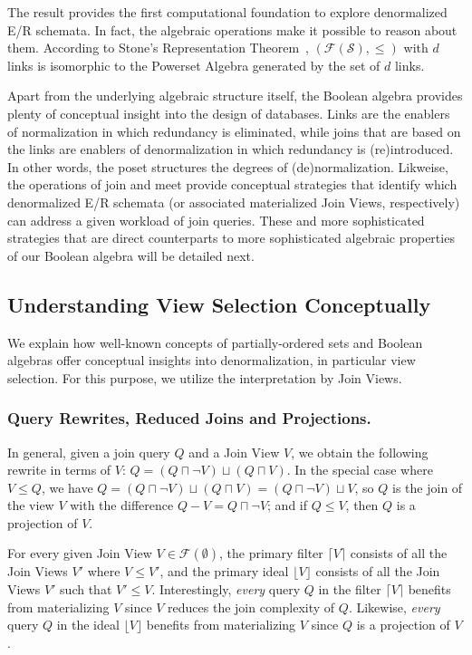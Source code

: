 \documentclass[sigconf]{acmart}
\begin{document}
The result provides the first computational foundation to explore denormalized E/R schemata. In fact, the algebraic operations make it possible to reason about them. According to Stone's Representation Theorem~\cite{stone1936}, $(\mathcal{F}(\mathcal{S}),\le)$ with $d$ links is isomorphic to the Powerset Algebra generated by the set of $d$ links.

Apart from the underlying algebraic structure itself, the Boolean algebra provides plenty of conceptual insight into the design of databases. Links are the enablers of normalization in which redundancy is eliminated, while joins that are based on the links are enablers of denormalization in which redundancy is (re)introduced. In other words, the poset structures the degrees of (de)normalization. Likweise, the operations of join and meet provide conceptual strategies that identify which denormalized E/R schemata (or associated materialized Join Views, respectively) can address a given workload of join queries. These and more sophisticated strategies that are direct counterparts to more sophisticated algebraic properties of our Boolean algebra will be detailed next.

\subsection{Understanding View Selection Conceptually}\label{sec:conceptual-view-selection}

We explain how well-known concepts of partially-ordered sets and Boolean algebras offer conceptual insights into denormalization, in particular view selection. For this purpose, we utilize the interpretation by Join Views.

\subsubsection{Query Rewrites, Reduced Joins and Projections.} In general, given a join query $Q$ and a Join View $V$, we obtain the following rewrite in terms of $V$: $Q=(Q\sqcap\neg V)\sqcup (Q\sqcap V)$. In the special case where $V\le Q$, we have $Q=(Q\sqcap\neg V)\sqcup (Q\sqcap V)=(Q\sqcap\neg V)\sqcup V$, so $Q$ is the join of the view $V$ with the difference $Q-V=Q\sqcap\neg V$; and if $Q\le V$, then $Q$ is a projection of $V$.

For every given Join View $V\in\mathcal{F}(\emptyset)$, the primary filter $\lceil V\rceil$ consists of all the Join Views $V'$ where $V\le V'$, and the primary ideal $\lfloor V\rfloor$ consists of all the Join Views $V'$ such that $V'\le V$. Interestingly, \emph{every} query $Q$ in the filter $\lceil V\rceil$ benefits from materializing $V$ since $V$ reduces the join complexity of $Q$. Likewise, \emph{every} query $Q$ in the ideal $\lfloor V\rfloor$ benefits from materializing $V$ since $Q$ is a projection of $V$.
\end{document}
